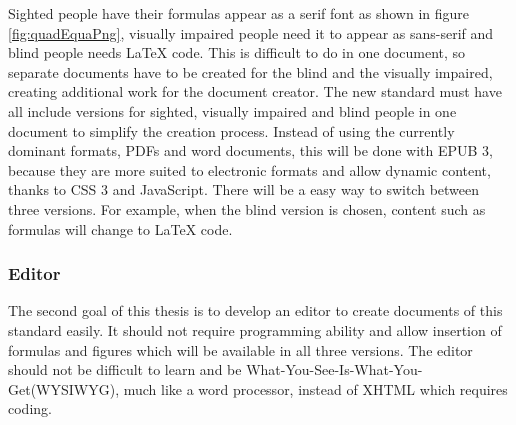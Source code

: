 Sighted people have their formulas appear as a serif font as shown in figure \ref{fig:quadEquaPng}, visually impaired people need it to appear as sans-serif and blind people needs LaTeX code.\cite{augenbitWiki} This is difficult to do in one document, so separate documents have to be created for the blind and the visually impaired, creating additional work for the document creator. The new standard must have all include versions for sighted, visually impaired and blind people in one document to simplify the creation process. Instead of using the currently dominant formats, PDFs and word documents, this will be done with EPUB 3, because they are more suited to electronic formats and allow dynamic content, thanks to CSS 3 and JavaScript. There will be a easy way to switch between three versions. For example, when the blind version is chosen, content such as formulas will change to LaTeX code.

\subsubsection{Editor}
The second goal of this thesis is to develop an editor to create documents of this standard easily. It should not require programming ability and allow insertion of formulas and figures which will be available in all three versions. The editor should not be difficult to learn and be  What-You-See-Is-What-You-Get(WYSIWYG), much like a word processor, instead of XHTML which requires coding.